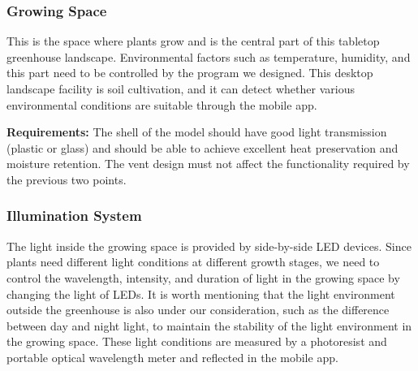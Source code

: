 \subsubsection{Growing Space}
This is the space where plants grow and is the central part of this tabletop greenhouse landscape. Environmental factors such as temperature, humidity, and this part need to be controlled by the program we designed. This desktop landscape facility is soil cultivation, and it can detect whether various environmental conditions are suitable through the mobile app.

\textbf{Requirements:} 
The shell of the model should have good light transmission (plastic or glass) and should be able to achieve excellent heat preservation and moisture retention. The vent design must not affect the functionality required by the previous two points.

\subsubsection{Illumination System}
The light inside the growing space is provided by side-by-side LED devices. Since plants need different light conditions at different growth stages, we need to control the wavelength, intensity, and duration of light in the growing space by changing the light of LEDs. It is worth mentioning that the light environment outside the greenhouse is also under our consideration, such as the difference between day and night light, to maintain the stability of the light environment in the growing space. These light conditions are measured by a photoresist and portable optical wavelength meter and reflected in the mobile app.

